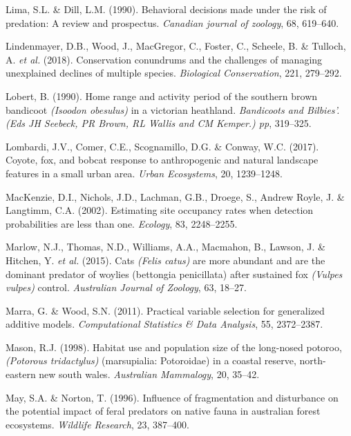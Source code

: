 \documentclass[11pt,a4paper,titlepage,twoside,openright]{style/unimelbthesis}
\begin{document}
\begin{mainmatter}
\leavevmode\hypertarget{ref-lima1990behavioral}{}%
Lima, S.L. \& Dill, L.M. (1990). Behavioral decisions made under the risk of predation: A review and prospectus. \emph{Canadian journal of zoology}, 68, 619--640.

\leavevmode\hypertarget{ref-lindenmayer2018conservation}{}%
Lindenmayer, D.B., Wood, J., MacGregor, C., Foster, C., Scheele, B. \& Tulloch, A. \emph{et al.} (2018). Conservation conundrums and the challenges of managing unexplained declines of multiple species. \emph{Biological Conservation}, 221, 279--292.

\leavevmode\hypertarget{ref-lobert1990home}{}%
Lobert, B. (1990). Home range and activity period of the southern brown bandicoot \emph{(Isoodon obesulus)} in a victorian heathland. \emph{Bandicoots and Bilbies'.(Eds JH Seebeck, PR Brown, RL Wallis and CM Kemper.) pp}, 319--325.

\leavevmode\hypertarget{ref-lombardi2017coyote}{}%
Lombardi, J.V., Comer, C.E., Scognamillo, D.G. \& Conway, W.C. (2017). Coyote, fox, and bobcat response to anthropogenic and natural landscape features in a small urban area. \emph{Urban Ecosystems}, 20, 1239--1248.

\leavevmode\hypertarget{ref-mackenzie2002estimating}{}%
MacKenzie, D.I., Nichols, J.D., Lachman, G.B., Droege, S., Andrew Royle, J. \& Langtimm, C.A. (2002). Estimating site occupancy rates when detection probabilities are less than one. \emph{Ecology}, 83, 2248--2255.

\leavevmode\hypertarget{ref-marlow2015cats}{}%
Marlow, N.J., Thomas, N.D., Williams, A.A., Macmahon, B., Lawson, J. \& Hitchen, Y. \emph{et al.} (2015). Cats \emph{(Felis catus)} are more abundant and are the dominant predator of woylies (bettongia penicillata) after sustained fox \emph{(Vulpes vulpes)} control. \emph{Australian Journal of Zoology}, 63, 18--27.

\leavevmode\hypertarget{ref-marra2011practical}{}%
Marra, G. \& Wood, S.N. (2011). Practical variable selection for generalized additive models. \emph{Computational Statistics \& Data Analysis}, 55, 2372--2387.

\leavevmode\hypertarget{ref-mason1998habitat}{}%
Mason, R.J. (1998). Habitat use and population size of the long-nosed potoroo, \emph{(Potorous tridactylus)} (marsupialia: Potoroidae) in a coastal reserve, north-eastern new south wales. \emph{Australian Mammalogy}, 20, 35--42.

\leavevmode\hypertarget{ref-may1996influence}{}%
May, S.A. \& Norton, T. (1996). Influence of fragmentation and disturbance on the potential impact of feral predators on native fauna in australian forest ecosystems. \emph{Wildlife Research}, 23, 387--400.


\end{mainmatter}
\end{document}
